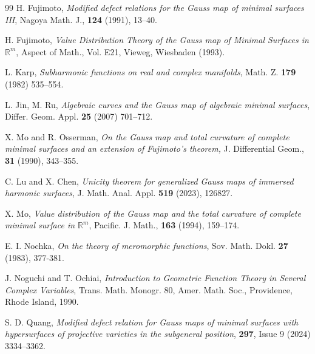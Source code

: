 \documentclass[12pt,article]{amsart}
\newcommand{\R}{{\mathbb{R}}}
\numberwithin{equation}{section}
\begin{document}
\begin{thebibliography}{99}
 H. Fujimoto, \textit{Modified defect relations for the Gauss map of minimal surfaces III}, Nagoya Math. J., \textbf{124} (1991), 13--40.


 H. Fujimoto, \textit{Value Distribution Theory of the Gauss map of Minimal Surfaces in $\R^m$}, Aspect of Math., Vol. E21, Vieweg, Wiesbaden (1993).

 L. Karp, \textit{Subharmonic functions on real and complex manifolds}, Math. Z. \textbf{179} (1982) 535--554. 

 L. Jin, M. Ru, \textit{Algebraic curves and the Gauss map of algebraic minimal surfaces}, Differ. Geom. Appl. \textbf{25} (2007) 701--712.

 X. Mo and R. Osserman, \textit{On the Gauss map and total curvature of complete minimal surfaces and an extension of Fujimoto's theorem,} J. Differential Geom., \textbf{31} (1990), 343--355.

 C. Lu and X. Chen, \textit{Unicity theorem for generalized Gauss maps of immersed harmonic surfaces}, J. Math. Anal. Appl. \textbf{519} (2023), 126827.

 X. Mo, \textit{Value distribution of the Gauss map and the total curvature of complete minimal surface in $\R^m$}, Pacific. J. Math., \textbf{163}  (1994), 159--174.

 E. I. Nochka, \textit{On the theory of meromorphic functions}, Sov. Math. Dokl. {\bf 27} (1983), 377-381.

 J. Noguchi and T. Ochiai, \textit{Introduction to Geometric Function Theory in Several Complex Variables}, Trans. Math. Monogr. 80,
Amer. Math. Soc., Providence, Rhode Island, 1990.

 S. D. Quang, \textit{Modified defect relation for Gauss maps of minimal surfaces with hypersurfaces of projective varieties in the subgeneral position}, \textbf{297}, Issue 9 (2024) 3334--3362.



\end{thebibliography}
\end{document}
